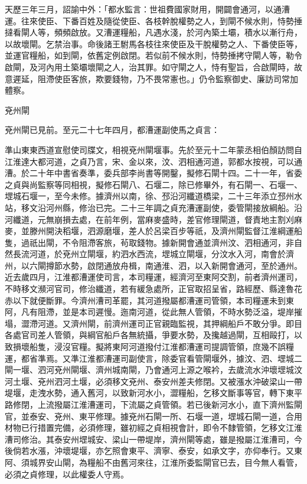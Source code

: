 \begin{pinyinscope}
 天歷三年三月，詔諭中外：「都水監言：世祖費國家財用，開闢會通河，以通漕運。往來使臣、下番百姓及隨從使臣、各枝幹脫權勢之人，到閘不候水則，恃勢捶撻看閘人等，頻頻啟放。又漕運糧船，凡遇水淺，於河內築土壩，積水以漸行舟，以故壞閘。乞禁治事。命後諸王駙馬各枝往來使臣及干脫權勢之人、下番使臣等，並運官糧船，如到閘，依舊定例啟閉。若似前不候水則，恃勢捶拷守閘人等，勒令啟閘，及河內用土築壩壞閘之人，治其罪。如守閘之人，恃有聖旨，合啟閘時，故意遲延，阻滯使臣客旅，欺要錢物，乃不畏常憲也。」仍令監察御史、廉訪司常加體察。



 兗州閘



 兗州閘已見前。至元二十七年四月，都漕運副使馬之貞言：



 準山東東西道宣慰使司牒文，相視兗州閘堰事。先於至元十二年蒙丞相伯顏訪問自江淮達大都河道，之貞乃言，宋、金以來，汶、泗相通河道，郭都水按視，可以通漕。於二十年中書省奏準，委兵部李尚書等開鑿，擬修石閘十四。二十一年，省委之貞與尚監察等同相視，擬修石閘八、石堰二，除已修畢外，有石閘一、石堰一、堽城石堰一，至今未修。據濟州以南，徐、邳沿河纖道橋梁，二十三年添立邳州水站，移文沿河州縣，修治已完。二十三年調之貞充漕運副使，委管閘接放綱船。沿河纖道，元無崩損去處，在前年例，當麻麥盛時，差官修理閘道，督責地主割刈麻麥，並滕州開決稻堰，泗源磨堰，差人於呂梁百步等祇，及濟州閘監督江淮綱運船隻，過祇出閘，不令阻滯客旅，茍取錢物。據新開會通並濟州汶、泗相通河，非自然長流河道，於兗州立閘堰，約泗水西流，堽城立閘堰，分汶水入河，南會於濟州，以六閘撙節水勢，啟閉通放舟楫，南通淮、泗，以入新開會通河，至於通州。近去歲四月，江淮都漕運使司言，本司糧運，經濟河至東阿交割，前者濟州運司，不時移文瀕河官司，修治纖道，若有緩急處所，正官取招呈省，路經歷、縣達魯花赤以下就便斷罪。今濟州漕司革罷，其河道撥屬都漕運司管領，本司糧運未到東阿，凡有阻滯，並是本司遲慢。迤南河道，從此無人管領，不時水勢泛溢，堤岸摧塌，澀滯河道。又濟州閘，前濟州運司正官親臨監視，其押綱船戶不敢分爭。即目各處官司差人管領，與綱官船戶各無統攝，爭要水勢，及攙越過閘，互相毆打，以致損壞船隻，浸沒官糧。擬將東阿河道撥付江淮都漕運司提調管領，庶幾不誤糧運，都省準焉。又準江淮都漕運司副使言，除委官看管閘堰外，據汶、泗、堽城二閘一堰、泗河兗州閘堰、濟州城南閘，乃會通河上源之喉衿，去歲流水沖壞堽城汶河土堰、兗州泗河土堰，必須移文兗州、泰安州差夫修閉。又被漲水沖破梁山一帶堤堰，走洩水勢，通入舊河，以致新河水小，澀糧船，乞移文斷事等官，轉下東平路修閉，上流撥屬江淮漕運司，下流屬之貞管領。若已後新河水小，直下濟州監閘官，並泰安、兗州、東平修理。據兗州石閘一所、石堰一道，堽城石閘一道，合用材物已行措置完備，必須修理，雖初經之貞相視會計，即令不隸管領，乞移文江淮漕司修治。其泰安州堽城安、梁山一帶堤岸，濟州閘等處，雖是撥屬江淮漕司，今後倘若水漲，沖壞堤堰，亦乞照會東平、濟寧、泰安，如承文字，亦仰奉行。又東阿、須城界安山閘，為糧船不由舊河來往，江淮所委監閘官已去，目今無人看管，必須之貞修理，以此權委人守焉。



\end{pinyinscope}